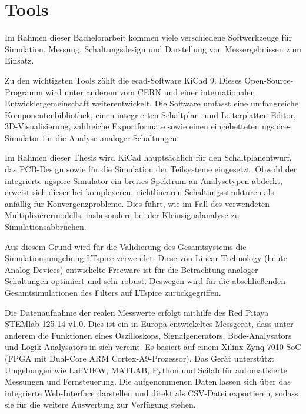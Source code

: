 %

\chapter{Tools}

Im Rahmen dieser Bachelorarbeit kommen viele verschiedene Softwerkzeuge für Simulation, Messung, Schaltungsdesign und Darstellung von Messergebnissen zum Einsatz.\par
\medskip
Zu den wichtigsten Tools zählt die \gls{ecad}-Software KiCad 9. Dieses Open-Source-Programm wird unter anderem vom CERN und einer internationalen Entwicklergemeinschaft weiterentwickelt. Die Software umfasst eine umfangreiche Komponentenbibliothek, einen integrierten Schaltplan- und Leiterplatten-Editor, 3D-Visualisierung, zahlreiche Exportformate sowie einen eingebetteten ngspice-Simulator für die Analyse analoger Schaltungen. \par
\medskip

Im Rahmen dieser Thesis wird KiCad hauptsächlich für den Schaltplanentwurf, das PCB-Design sowie für die Simulation der Teilsysteme eingesetzt. Obwohl der integrierte ngspice-Simulator ein breites Spektrum an Analysetypen abdeckt, erweist sich dieser bei komplexeren, nichtlinearen Schaltungsstrukturen als anfällig für Konvergenzprobleme. Dies führt, wie im Fall des verwendeten Multiplizierermodells, insbesondere bei der Kleinsignalanalyse zu Simulationsabbrüchen.\par
\medskip

Aus diesem Grund wird für die Validierung des Gesamtsystems die Simulationsumgebung LTspice verwendet. Diese von Linear Technology (heute Analog Devices) entwickelte Freeware ist für die Betrachtung analoger Schaltungen optimiert und sehr robust. Deswegen wird für die abschließenden Gesamtsimulationen des Filters auf LTspice zurückgegriffen.\par
\medskip 

Die Datenaufnahme der realen Messwerte erfolgt mithilfe des Red Pitaya STEMlab 125-14 v1.0. Dies ist ein in Europa entwickeltes Messgerät, dass unter anderem die Funktionen eines Oszilloskops, Signalgenerators, Bode-Analysators und Logik-Analysators in sich vereint. Es basiert auf einem Xilinx Zynq 7010 SoC (FPGA mit Dual-Core ARM Cortex-A9-Prozessor). Das Gerät unterstützt Umgebungen wie LabVIEW, MATLAB, Python und Scilab für automatisierte Messungen und Fernsteuerung. Die aufgenommenen Daten lassen sich über das integrierte Web-Interface darstellen und direkt als CSV-Datei exportieren, sodass sie für die weitere Auswertung zur Verfügung stehen.\par
\medskip

